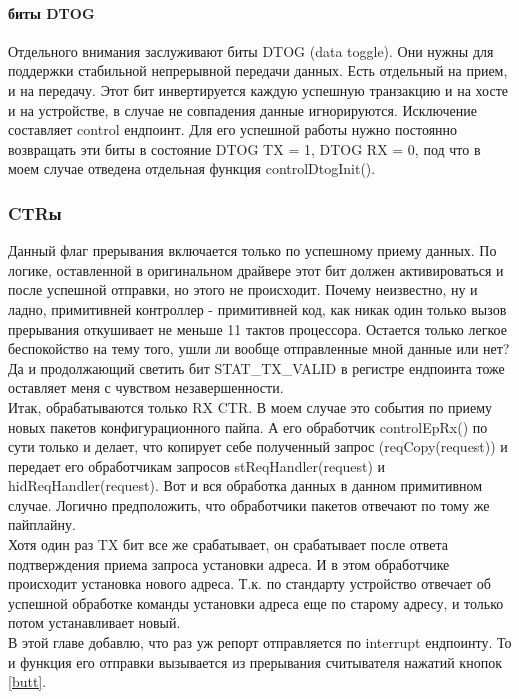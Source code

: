 \documentclass[12pt,a4paper]{article}
\begin{document}
\paragraph{биты DTOG}
    Отдельного внимания заслуживают биты DTOG (data toggle). Они нужны для
    поддержки стабильной непрерывной передачи данных. Есть отдельный на прием, и на
    передачу. Этот бит инвертируется каждую успешную транзакцию и на хосте и на
    устройстве, в случае не совпадения данные игнорируются. Исключение
    составляет control ендпоинт. Для его успешной работы нужно постоянно
    возвращать эти биты в состояние DTOG TX = 1, DTOG RX = 0, под что в моем
    случае отведена отдельная функция controlDtogInit().

\subsubsection{CTRы}
    Данный флаг прерывания включается только по успешному приему данных. По
    логике, оставленной в оригинальном драйвере этот бит должен активироваться
    и после успешной отправки, но этого не происходит. Почему неизвестно, ну и
    ладно, примитивней контроллер - примитивней код, как никак один только
    вызов прерывания откушивает не меньше 11 тактов процессора. Остается только
    легкое беспокойство на тему того, ушли ли вообще отправленные мной данные
    или нет? Да и продолжающий светить бит STAT\_TX\_VALID в регистре ендпоинта
    тоже оставляет меня с чувством незавершенности.\\
    Итак, обрабатываются только RX CTR. В моем случае это события по приему
    новых пакетов конфигурационного пайпа. А его обработчик controlEpRx() по сути только и
    делает, что копирует себе полученный запрос (reqCopy(request)) и передает
    его обработчикам запросов stReqHandler(request) и hidReqHandler(request).
    Вот и вся обработка данных в данном примитивном случае. Логично
    предположить, что обработчики пакетов отвечают по тому же пайплайну.\\
    Хотя один раз TX бит все же срабатывает, он срабатывает после ответа
    подтверждения приема запроса установки адреса. И в этом обработчике
    происходит установка нового адреса. Т.к. по стандарту устройство отвечает
    об успешной обработке команды установки адреса еще по старому адресу, и
    только потом устанавливает новый.\\
    В этой главе добавлю, что раз уж репорт отправляется по interrupt
    ендпоинту. То и функция его отправки вызывается из прерывания считывателя
    нажатий кнопок \ref{butt}.
\end{document}
